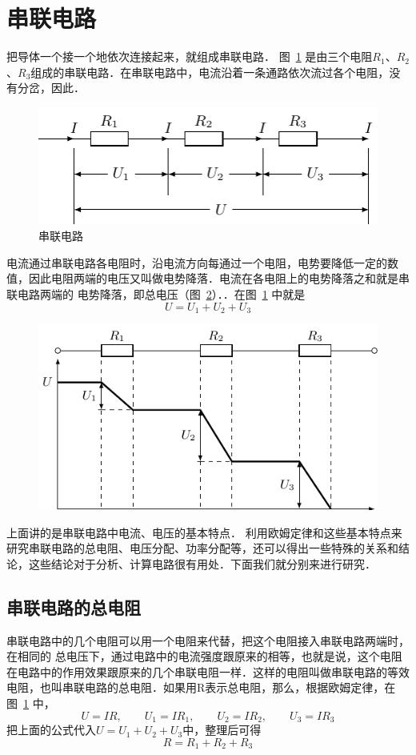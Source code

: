 \section{串联电路}
把导体一个接一个地依次连接起来，就组成串联电路．
图~\ref{fig_B_7-5} 是由三个电阻$R_1$、$R_2$、$R_3$组成的串联电路．在串联电路中，电流沿着一条通路依次流过各个电阻，没有分岔，因此．
\begin{figure}[htbp]
    \centering
    \includegraphics{fig/B/7-5.pdf}
    \caption{串联电路}\label{fig_B_7-5}
\end{figure}	

电流通过串联电路各电阻时，沿电流方向每通过一个电阻，电势要降低一定的数值，因此电阻两端的电压又叫做电势降落．电流在各电阻上的电势降落之和就是串联电路两端的
电势降落，即总电压（图~\ref{fig_B_7-6}）．．在图~\ref{fig_B_7-5} 中就是
\[U=U_1+U_2+U_3\]
\begin{figure}[htbp]
    \centering
    \includegraphics{fig/B/7-6.pdf}
    \caption{}\label{fig_B_7-6}
\end{figure}


上面讲的是串联电路中电流、电压的基本特点．
利用欧姆定律和这些基本特点来研究串联电路的总电阻、电压分配、功率分配等，还可以得出一些特殊的关系和结论，这些结论对于分析、计算电路很有用处．下面我们就分别来进行研究．

\subsection{串联电路的总电阻} 
串联电路中的几个电阻可以用一个电阻来代替，把这个电阻接入串联电路两端时，在相同的
总电压下，通过电路中的电流强度跟原来的相等，也就是说，这个电阻在电路中的作用效果跟原来的几个串联电阻一样．这样的电阻叫做串联电路的等效电阻，也叫串联电路的总电阻．如果用R表示总电阻，那么，根据欧姆定律，在图~\ref{fig_B_7-5} 中，
\[U=IR,\qquad  U_1=IR_1,\qquad U_2=IR_2,\qquad U_3=IR_3\]
把上面的公式代入$U=U_1+U_2+U_3$中，整理后可得
\[R=R_1+R_2+R_3\]

